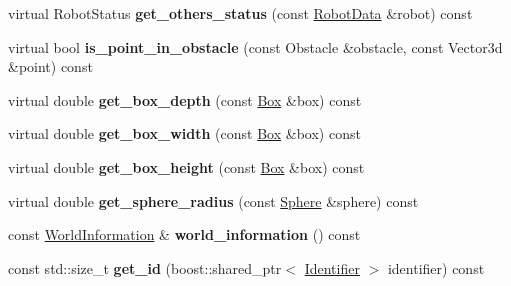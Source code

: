 \begin{CompactItemize}
\item 
\hypertarget{class_view_92957bbd0b1b435457aaa1929d2624e7}{
virtual RobotStatus \textbf{get\_\-others\_\-status} (const \hyperlink{class_robot_data}{RobotData} \&robot) const }
\label{class_view_92957bbd0b1b435457aaa1929d2624e7}

\item 
\hypertarget{class_view_a74a9578c6666c81a68c28e820a79afc}{
virtual bool \textbf{is\_\-point\_\-in\_\-obstacle} (const Obstacle \&obstacle, const Vector3d \&point) const }
\label{class_view_a74a9578c6666c81a68c28e820a79afc}

\item 
\hypertarget{class_view_0b6fb511a898ac846f3cccfe8fa001be}{
virtual double \textbf{get\_\-box\_\-depth} (const \hyperlink{class_box}{Box} \&box) const }
\label{class_view_0b6fb511a898ac846f3cccfe8fa001be}

\item 
\hypertarget{class_view_9c80969a2b1c7d666f69c3f231497b38}{
virtual double \textbf{get\_\-box\_\-width} (const \hyperlink{class_box}{Box} \&box) const }
\label{class_view_9c80969a2b1c7d666f69c3f231497b38}

\item 
\hypertarget{class_view_cf48aefe3cd585a6ffb006b35335b77d}{
virtual double \textbf{get\_\-box\_\-height} (const \hyperlink{class_box}{Box} \&box) const }
\label{class_view_cf48aefe3cd585a6ffb006b35335b77d}

\item 
\hypertarget{class_view_e0d7ac1ffcaced2ad17fd0523ae22132}{
virtual double \textbf{get\_\-sphere\_\-radius} (const \hyperlink{class_sphere}{Sphere} \&sphere) const }
\label{class_view_e0d7ac1ffcaced2ad17fd0523ae22132}

\item 
\hypertarget{class_view_0d4525686368867a77c6e96d8844b6eb}{
const \hyperlink{class_world_information}{WorldInformation} \& \textbf{world\_\-information} () const }
\label{class_view_0d4525686368867a77c6e96d8844b6eb}

\item 
\hypertarget{class_view_40880e5f3127deec2540235a657c749e}{
const std::size\_\-t \textbf{get\_\-id} (boost::shared\_\-ptr$<$ \hyperlink{class_identifier}{Identifier} $>$ identifier) const }
\label{class_view_40880e5f3127deec2540235a657c749e}

\end{CompactItemize}
